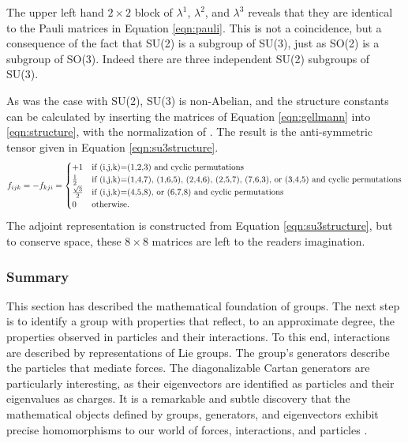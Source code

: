 The upper left hand $2\times2$ block of $\lambda^1$, $\lambda^2$, and $\lambda^3$ reveals that they are identical to the Pauli matrices in Equation \ref{eqn:pauli}.
This is not a coincidence, but a consequence of the fact that SU(2) is a subgroup of SU(3), just as SO(2) is a subgroup of SO(3).
Indeed there are three independent SU(2) subgroups of SU(3).

As was the case with SU(2), SU(3) is non-Abelian, and the structure constants can be calculated by inserting the matrices of Equation \ref{eqn:gellmann} into \ref{eqn:structure}, with the normalization of \half. 
The result is the anti-symmetric tensor given in Equation \ref{eqn:su3structure}. \check
\begin{equation}
\begin{split}\label{eqn:su3structure}
f_{ijk} =-f_{kji}= \begin{cases}
+1 &\text{if (i,j,k)=(1,2,3) and cyclic permutations}\\
\frac{1}{2} &\text{if (i,j,k)=(1,4,7), (1,6,5), (2,4,6), (2,5,7), (7,6,3), or (3,4,5) and cyclic permutations}\\
\frac{\sqrt{3}}{2} &\text{if (i,j,k)=(4,5,8), or (6,7,8) and cyclic permutations}\\
0 &\text{otherwise.}
\end{cases} 
\end{split}
\end{equation} 
The adjoint representation is constructed from Equation \ref{eqn:su3structure}, but to conserve space, these $8\times8$ matrices are left to the readers imagination.

\subsubsection{Summary}

This section has described the mathematical foundation of groups.
The next step is to identify a group with properties that reflect, to an approximate degree, the properties observed in particles and their interactions.
To this end, interactions are described by representations of Lie groups.
The group's generators describe the particles that mediate forces.
The diagonalizable Cartan generators are particularly interesting, as their eigenvectors are identified as particles and their eigenvalues as charges.
It is a remarkable and subtle discovery that the mathematical objects defined by groups, generators, and eigenvectors exhibit precise homomorphisms to our world of forces, interactions, and particles
\cite{robinson}.



